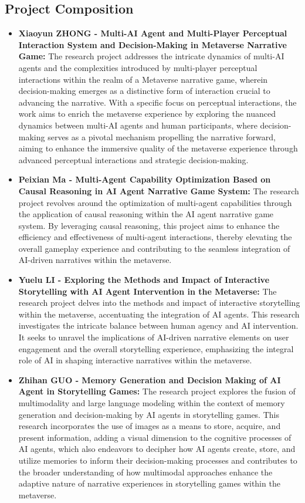 \subsection{Project Composition}
\begin{itemize}
    \item \textbf{Xiaoyun ZHONG - Multi-AI Agent and Multi-Player Perceptual Interaction System and Decision-Making in Metaverse Narrative Game:}
    The research project addresses the intricate dynamics of multi-AI agents and the complexities introduced by multi-player perceptual interactions within the realm of a Metaverse narrative game, 
    wherein decision-making emerges as a distinctive form of interaction crucial to advancing the narrative. With a specific focus on perceptual interactions, 
    the work aims to enrich the metaverse experience by exploring the nuanced dynamics between multi-AI agents and human participants, where decision-making serves as a pivotal mechanism propelling the narrative forward, 
    aiming to enhance the immersive quality of the metaverse experience through advanced perceptual interactions and strategic decision-making.
    \item \textbf{Peixian Ma - Multi-Agent Capability Optimization Based on Causal Reasoning in AI Agent Narrative Game System:}
    The research project revolves around the optimization of multi-agent capabilities through the application of causal reasoning within the AI agent narrative game system. 
    By leveraging causal reasoning, this project aims to enhance the efficiency and effectiveness of multi-agent interactions, 
    thereby elevating the overall gameplay experience and contributing to the seamless integration of AI-driven narratives within the metaverse.
    \item \textbf{Yuelu LI - Exploring the Methods and Impact of Interactive Storytelling with AI Agent Intervention in the Metaverse:}
    The research project delves into the methods and impact of interactive storytelling within the metaverse, 
    accentuating the integration of AI agents. This research investigates the intricate balance between human agency and AI intervention. 
    It seeks to unravel the implications of AI-driven narrative elements on user engagement and the overall storytelling experience, 
    emphasizing the integral role of AI in shaping interactive narratives within the metaverse.
    \item \textbf{Zhihan GUO - Memory Generation and Decision Making of AI Agent in Storytelling Games:}
    The research project explores the fusion of multimodality and large language modeling within the context of memory generation and decision-making by AI agents in storytelling games. 
    This research incorporates the use of images as a means to store, acquire, and present information, adding a visual dimension to the cognitive processes of AI agents, 
    which also endeavors to decipher how AI agents create, store, and utilize memories to inform their decision-making processes and contributes to the broader understanding of how multimodal approaches enhance the adaptive nature of narrative experiences in storytelling games within the metaverse.
\end{itemize}

